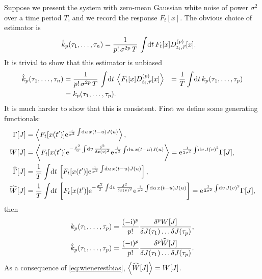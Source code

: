 \documentclass[12pt]{article}
\theoremstyle{slplain}
\theoremstyle{sldefinition}
\theoremstyle{remark}
\newcommand{\hz}{\widehat{\Gamma}}
\newcommand{\hw}{\widehat{W}}
\begin{document}
Suppose we present the system with zero-mean Gaussian white noise of power $\sigma^2$ over a time period $T$, and we record the response $F_t[x]$. The obvious choice of estimator is
%
\begin{equation}\label{eq:wienerest}
  \begin{aligned}
    \hat{k}_p(\tau_1,\ldots,\tau_n) &= \frac{1}{p!\,\sigma^{2p}\,T} \, \int\!\mathrm{d} t\, F_t[x] D^{(p)}_{t_i,\vec{\tau}}[x] .
  \end{aligned}
\end{equation}
%
It is trivial to show that this estimator is unbiased
%
\begin{equation}\label{eq:wienerestbias}
  \begin{aligned}
    \hat{k}_p(\tau_1,\ldots,\tau_n) &= \frac{1}{p!\,\sigma^{2p}\,T} \, \int\!\mathrm{d} t\, \left\langle F_t[x] D^{(p)}_{t_i,\vec{\tau}}[x] \right\rangle 
      &= \frac{1}{T}\int\!\mathrm{d} t\,k_p(\tau_1,\ldots,\tau_p) \\
      &= k_p(\tau_1,\ldots,\tau_p).
  \end{aligned}
\end{equation}
%
It is much harder to show that this is consistent. First we define some generating functionals:
%
\begin{equation}\label{eq:wienergen}
  \begin{aligned}
    \Gamma[J] &= \av{F_t[x(t')] \e^{\frac{\ir}{\sigma^2} \intd{u} x(t-u)J(u)}},  \\
    W[J] &= \av{F_t[x(t')] \e^{-\frac{\sigma^2}{2} \intd{v}\fdf{^2}{x(v)^2}} \e^{\frac{\ir}{\sigma^2} \intd{u} x(t-u)J(u)}}
     = \e^{\frac{1}{2\sigma^2} \intd{v}J(v)^2} \Gamma[J],  \\
    \hz[J] &= \frac{1}{T}\intd{t} \brk{F_t[x(t')] \e^{\frac{\ir}{\sigma^2} \intd{u} x(t-u)J(u)}},  \\
    \hw[J] &= \frac{1}{T}\intd{t} \brk{F_t[x(t')] \e^{-\frac{\sigma^2}{2} \intd{v}\fdf{^2}{x(v)^2}} \e^{\frac{\ir}{\sigma^2} \intd{u} x(t-u)J(u)}}
     = \e^{\frac{1}{2\sigma^2} \intd{v}J(v)^2} \Gamma[J],  
  \end{aligned}
\end{equation}
%
then
%
\begin{equation}\label{eq:wienergendiff}
  \begin{aligned}
     k_p(\tau_1,\ldots,\tau_p) &= \frac{(-\ir)^{p}}{p!} \fdf{^p W[J]}{J(\tau_1)\ldots\delta J(\tau_p)}, \\
     \hat{k}_p(\tau_1,\ldots,\tau_p) &= \frac{(-\ir)^{p}}{p!} \fdf{^p \hw[J]}{J(\tau_1)\ldots\delta J(\tau_p)}.
  \end{aligned}
\end{equation}
%
As a consequence of \eqref{eq:wienerestbias}, $\av{\hw[J]}=W[J]$.
\end{document}
